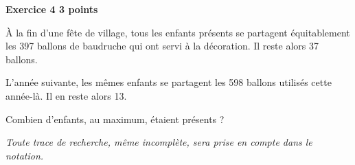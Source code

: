 \textbf{Exercice 4 \hfill 3 points}

\medskip

À la fin d'une fête de village, tous les enfants présents se partagent équitablement les 397
ballons de baudruche qui ont servi à la décoration. Il reste alors 37 ballons. 

\smallskip

L'année suivante, les mêmes enfants se partagent les 598 ballons utilisés cette année-là.
Il en reste alors 13.

\smallskip

Combien d'enfants, au maximum, étaient présents ?

\emph{Toute trace de recherche, même incomplète, sera prise en compte dans le notation.}

\vspace{0,5cm}

